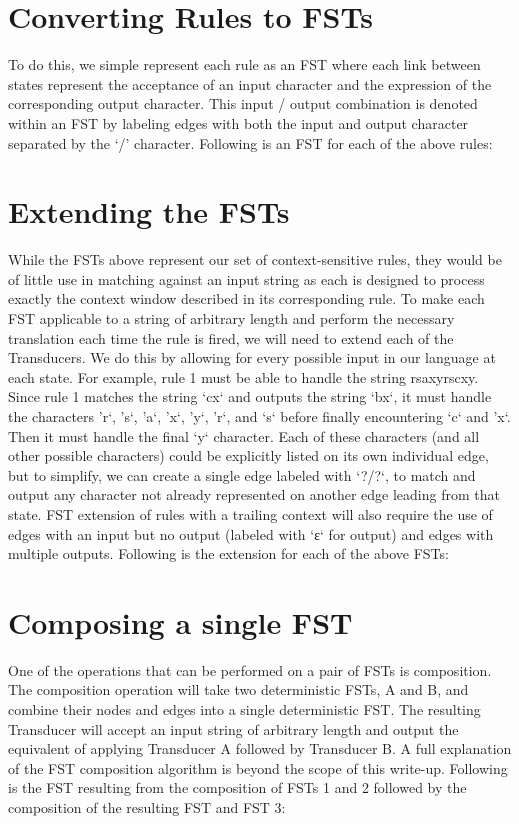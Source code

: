 \section{Converting Rules to FSTs}
To do this, we simple represent each rule as an FST where each link between states represent the acceptance of an input character and the expression of the corresponding output character. This input / output combination is denoted within an FST by labeling edges with both the input and output character separated by the ‘/’ character. Following is an FST for each of the above rules:


\section{Extending the FSTs}
While the FSTs above represent our set of context-sensitive rules, they would be of little use in matching against an input string as each is designed to process exactly the context window described in its corresponding rule. To make each FST applicable to a string of arbitrary length and perform the necessary translation each time the rule is fired, we will need to extend each of the Transducers. We do this by allowing for every possible input in our language at each state. For example, rule 1 must be able to handle the string rsaxyrscxy. Since rule 1 matches the string ‘cx‘ and outputs the string ‘bx‘, it must handle the characters ’r‘, ’s‘, ’a‘, ’x‘, ’y‘, ’r‘, and ‘s‘ before finally encountering ‘c‘ and ’x‘. Then it must handle the final ‘y‘ character. Each of these characters (and all other possible characters) could be explicitly listed on its own individual edge, but to simplify, we can create a single edge labeled with ‘?/?‘, to match and output any character not already represented on another edge leading from that state. FST extension of rules with a trailing context will also require the use of edges with an input but no output (labeled with ‘ε‘ for output) and edges with multiple outputs. Following is the extension for each of the above FSTs:
\newpage
{}

\section{Composing a single FST}
One of the operations that can be performed on a pair of FSTs is composition. The composition operation will take two deterministic FSTs, A and B, and combine their nodes and edges into a single deterministic FST. The resulting Transducer will accept an input string of arbitrary length and output the equivalent of applying Transducer A followed by Transducer B. A full explanation of the FST composition algorithm is beyond the scope of this write-up. Following is the FST resulting from the composition of FSTs 1 and 2 followed by the composition of the resulting FST and FST 3:
\newpage
{}

